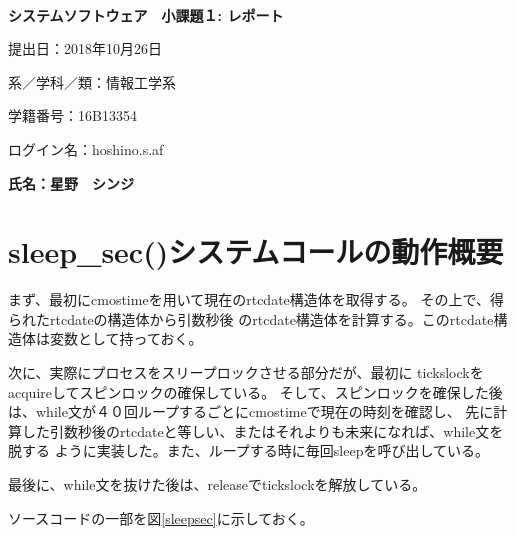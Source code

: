 \documentclass[a4j,11pt]{jarticle}
\begin{document}
\begin{center}
　\vspace{10mm}

{\bf {\huge システムソフトウェア　小課題１: レポート}}

\vspace{80mm}

提出日：2018年10月26日

\vspace{10mm}

系／学科／類：情報工学系

\vspace{10mm}

学籍番号：16B13354

\vspace{10mm}

ログイン名：hoshino.s.af

\vspace{20mm}

{\bf {\LARGE 氏名：星野　シンジ}}
\end{center}

\newpage

\section{sleep\_sec()システムコールの動作概要}

まず、最初にcmostimeを用いて現在のrtcdate構造体を取得する。
その上で、得られたrtcdateの構造体から引数秒後
のrtcdate構造体を計算する。このrtcdate構造体は変数として持っておく。

次に、実際にプロセスをスリープロックさせる部分だが、最初に
tickslockをacquireしてスピンロックの確保している。
そして、スピンロックを確保した後は、while文が４０回ループするごとにcmostimeで現在の時刻を確認し、
先に計算した引数秒後のrtcdateと等しい、またはそれよりも未来になれば、while文を脱する
ように実装した。また、ループする時に毎回sleepを呼び出している。

最後に、while文を抜けた後は、releaseでtickslockを解放している。

ソースコードの一部を図\ref{sleepsec}に示しておく。
\end{document}
